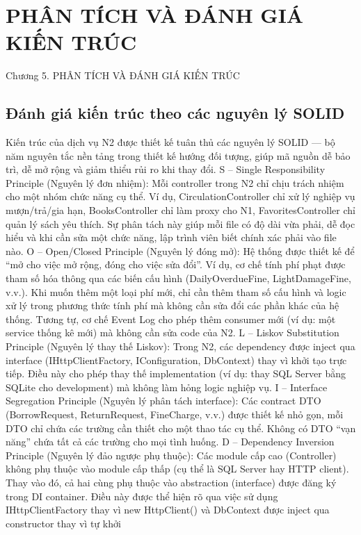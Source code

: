 \chapter{PHÂN TÍCH VÀ ĐÁNH GIÁ KIẾN TRÚC}

Chương 5. PHÂN TÍCH VÀ ĐÁNH GIÁ KIẾN TRÚC

\section{Đánh giá kiến trúc theo các nguyên lý SOLID}

Kiến trúc của dịch vụ N2 được thiết kế tuân thủ các nguyên lý SOLID — bộ năm nguyên tắc nền tảng trong thiết kế hướng đối tượng, giúp mã nguồn dễ bảo trì, dễ mở rộng và giảm thiểu rủi ro khi thay đổi. S – Single Responsibility Principle (Nguyên lý đơn nhiệm): Mỗi controller trong N2 chỉ chịu trách nhiệm cho một nhóm chức năng cụ thể. Ví dụ, CirculationController chỉ xử lý nghiệp vụ mượn/trả/gia hạn, BooksController chỉ làm proxy cho N1, FavoritesController chỉ quản lý sách yêu thích. Sự phân tách này giúp mỗi file có độ dài vừa phải, dễ đọc hiểu và khi cần sửa một chức năng, lập trình viên biết chính xác phải vào file nào. O – Open/Closed Principle (Nguyên lý đóng mở): Hệ thống được thiết kế để “mở cho việc mở rộng, đóng cho việc sửa đổi”. Ví dụ, cơ chế tính phí phạt được tham số hóa thông qua các biến cấu hình (DailyOverdueFine, LightDamageFine, v.v.). Khi muốn thêm một loại phí mới, chỉ cần thêm tham số cấu hình và logic xử lý trong phương thức tính phí mà không cần sửa đổi các phần khác của hệ thống. Tương tự, cơ chế Event Log cho phép thêm consumer mới (ví dụ: một service thống kê mới) mà không cần sửa code của N2. L – Liskov Substitution Principle (Nguyên lý thay thế Liskov): Trong N2, các dependency được inject qua interface (IHttpClientFactory, IConfiguration, DbContext) thay vì khởi tạo trực tiếp. Điều này cho phép thay thế implementation (ví dụ: thay SQL Server bằng SQLite cho development) mà không làm hỏng logic nghiệp vụ. I – Interface Segregation Principle (Nguyên lý phân tách interface): Các contract DTO (BorrowRequest, ReturnRequest, FineCharge, v.v.) được thiết kế nhỏ gọn, mỗi DTO chỉ chứa các trường cần thiết cho một thao tác cụ thể. Không có DTO “vạn năng” chứa tất cả các trường cho mọi tình huống. D – Dependency Inversion Principle (Nguyên lý đảo ngược phụ thuộc): Các module cấp cao (Controller) không phụ thuộc vào module cấp thấp (cụ thể là SQL Server hay HTTP client). Thay vào đó, cả hai cùng phụ thuộc vào abstraction (interface) được đăng ký trong DI container. Điều này được thể hiện rõ qua việc sử dụng IHttpClientFactory thay vì new HttpClient() và DbContext được inject qua constructor thay vì tự khởi

